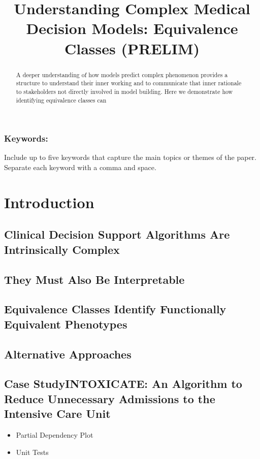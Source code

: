 \documentclass[10pt]{article}
\title{Understanding Complex Medical Decision Models: Equivalence Classes (PRELIM)}
\date{}
\begin{document}
\maketitle
\begin{abstract}
A deeper understanding of how models predict complex phenomenon provides a structure to understand their inner working and to communicate that inner rationale to stakeholders not directly involved in model building. Here we demonstrate how identifying equivalence classes can 
\end{abstract}

\subsubsection*{Keywords:}

Include up to five keywords that capture the main topics or themes of the paper. Separate each keyword with a comma and space.

\section{Introduction}\label{sec:intro}

\subsection{Clinical Decision Support Algorithms Are Intrinsically Complex}
\subsection{They Must Also Be Interpretable}
\subsection{Equivalence Classes Identify Functionally Equivalent Phenotypes}
\subsection{Alternative Approaches}
\subsection{Case Study\textemdash INTOXICATE: An Algorithm to Reduce Unnecessary Admissions to the Intensive Care Unit}
\begin{itemize}
  \item Partial Dependency Plot
  \item Unit Tests
\end{itemize}
\end{document}
